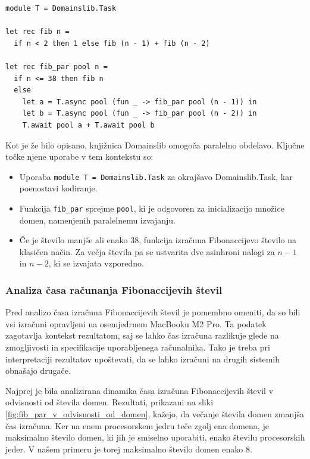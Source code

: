 \documentclass[mat1, tisk]{fmfdelo}
\begin{document}
\begin{lstlisting}
module T = Domainslib.Task

let rec fib n = 
  if n < 2 then 1 else fib (n - 1) + fib (n - 2)

let rec fib_par pool n =
  if n <= 38 then fib n
  else
    let a = T.async pool (fun _ -> fib_par pool (n - 1)) in
    let b = T.async pool (fun _ -> fib_par pool (n - 2)) in
    T.await pool a + T.await pool b
\end{lstlisting}

Kot je že bilo opisano, knjižnica Domainslib omogoča paralelno obdelavo. Ključne točke njene uporabe v tem kontekstu so:
\begin{itemize}
  \item Uporaba \texttt{module T = Domainslib.Task} za okrajšavo Domainslib.Task, kar poenostavi kodiranje.
  \item Funkcija \texttt{fib\_par} sprejme \texttt{pool}, ki je odgovoren za inicializacijo množice domen,
        namenjenih paralelnemu izvajanju. 
  \item Če je število manjše ali enako 38, funkcija izračuna Fibonaccijevo število na klasičen način. 
        Za večja števila pa se ustvarita dve asinhroni nalogi za $n-1$ in $n-2$, ki se izvajata vzporedno.
\end{itemize}

\subsubsection{Analiza časa računanja Fibonaccijevih števil}

Pred analizo časa izračuna Fibonaccijevih števil je pomembno omeniti, da so bili vsi izračuni opravljeni na
osemjedrnem MacBooku M2 Pro. Ta podatek zagotavlja kontekst rezultatom, saj se lahko čas izračuna razlikuje
glede na zmogljivosti in specifikacije uporabljenega računalnika. Tako je treba pri interpretaciji rezultatov
upoštevati, da se lahko izračuni na drugih sistemih obnašajo drugače.

Najprej je bila analizirana dinamika časa izračuna Fibonaccijevih števil v odvisnosti od števila domen. 
Rezultati, prikazani na sliki \ref{fig:fib_par_v_odvisnosti_od_domen}, kažejo, da večanje števila domen zmanjša čas
izračuna. Ker na enem procesorskem jedru teče zgolj ena domena, je maksimalno število domen, ki jih je smiselno uporabiti,
enako številu procesorskih jeder. V našem primeru je torej maksimalno število domen enako 8.
\end{document}
